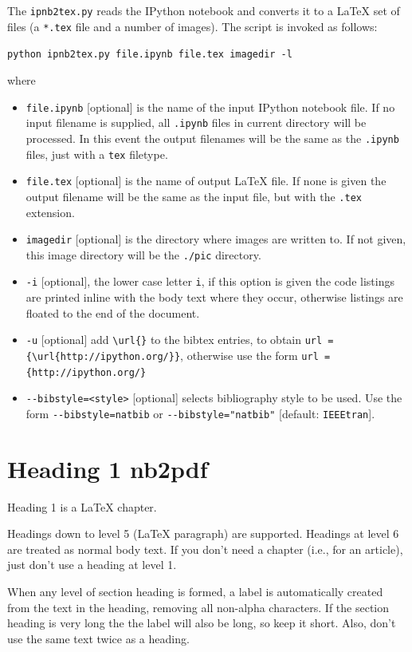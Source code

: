 \documentclass[english]{workpackage}[1996/06/02]
\begin{document}
The \verb+ipnb2tex.py+ reads the IPython notebook and converts it to a \LaTeX{} set of files (a \verb+*.tex+ file and a number of images).  The script is invoked as follows:


\verb+python ipnb2tex.py file.ipynb file.tex imagedir -l+


where


\begin{itemize}
\item \verb+file.ipynb+  [optional]   is the name of the input IPython notebook file.   If no input filename is  supplied, all  \verb+.ipynb+ files in current directory will be processed.   In this event the output filenames will be the same as the \verb+.ipynb+ files, just with a \verb+tex+ filetype.
\item \verb+file.tex+ [optional]  is the name of output \LaTeX{} file. If none is given the output filename will be the same as the input file, but with the \verb+.tex+ extension.
\item \verb+imagedir+   [optional]   is the directory where images are written to.  If not given, this image directory will be the \verb+./pic+ directory.
\item \verb+-i+  [optional], the lower case letter \verb+i+, if this option is given the code     listings are printed inline with the body text where they occur,       otherwise listings are floated to the end of the document.
\item \verb+-u+ [optional] add \verb+\url{}+ to the bibtex entries, to obtain  \verb+url = {\url{http://ipython.org/}}+, otherwise use the form \verb+url = {http://ipython.org/}+
\item \verb+--bibstyle=<style>+  [optional] selects bibliography style to be used.
     Use the form \verb+--bibstyle=natbib+ or \verb+--bibstyle="natbib"+ [default: \verb+IEEEtran+].
\end{itemize}


\chapter{Heading 1 nb2pdf}
\label{sec:Heading1nb2pdf}

Heading 1 is a \LaTeX{} chapter.


Headings down to level 5 (\LaTeX{} paragraph) are supported. 
Headings at level 6 are treated as normal body text.
If you don't need a chapter (i.e., for an article), just don't use a heading at level 1.


When any level of section heading is formed, a label is automatically created from the text in the heading, removing all non-alpha characters.  If the section heading is very long the the label will also be long, so keep it short. Also, don't use the same text twice as a heading.
\end{document}
